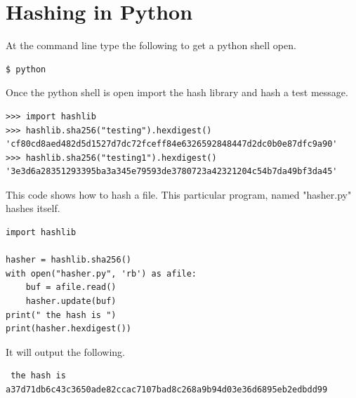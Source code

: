 \documentclass{tufte-handout}
\begin{document}
\section{Hashing in Python}
At the command line type the following to get a python shell open.
\small
\begin{shaded}
\begin{verbatim}
$ python
\end{verbatim}
\end{shaded}
\normalsize
Once the python shell is open import the hash library and hash a test message.
\small
\begin{shaded}
\begin{verbatim}
>>> import hashlib
>>> hashlib.sha256("testing").hexdigest()
'cf80cd8aed482d5d1527d7dc72fceff84e6326592848447d2dc0b0e87dfc9a90'
>>> hashlib.sha256("testing1").hexdigest()
'3e3d6a28351293395ba3a345e79593de3780723a42321204c54b7da49bf3da45'
\end{verbatim}
\end{shaded}
\normalsize
This code shows how to hash a file.  This particular program, named "hasher.py" hashes itself.
\small
\begin{framed}
\begin{verbatim}
import hashlib

hasher = hashlib.sha256()
with open("hasher.py", 'rb') as afile:
    buf = afile.read()
    hasher.update(buf)
print(" the hash is ")
print(hasher.hexdigest())
\end{verbatim}
\end{framed}


\normalsize
It will output the following.
\small
\begin{shaded}
\begin{verbatim}
 the hash is 
a37d71db6c43c3650ade82ccac7107bad8c268a9b94d03e36d6895eb2edbdd99
\end{verbatim}
\end{shaded}
\end{document}
